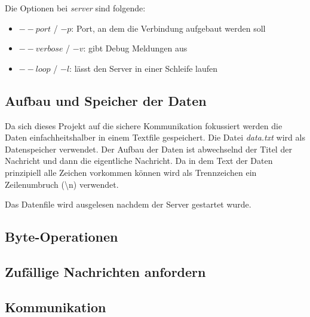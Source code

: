 \documentclass[]{article}
\begin{document}
\noindent
Die Optionen bei \textit{server} sind folgende:

\begin{itemize}
	\item $--port$ / $-p$: Port, an dem die Verbindung aufgebaut werden soll
	\item $--verbose$ / $-v$: gibt Debug Meldungen aus
	\item $--loop$ / $-l$: lässt den Server in einer Schleife laufen
\end{itemize}

\subsection{Aufbau und Speicher der Daten}
Da sich dieses Projekt auf die sichere Kommunikation fokussiert werden die Daten einfachheitshalber in einem Textfile gespeichert. Die Datei \textit{data.txt} wird als Datenspeicher verwendet. Der Aufbau der Daten ist abwechselnd der Titel der Nachricht und dann die eigentliche Nachricht. Da in dem Text der Daten prinzipiell alle Zeichen vorkommen können wird als Trennzeichen ein Zeilenumbruch (\textbackslash n) verwendet.

Das Datenfile wird ausgelesen nachdem der Server gestartet wurde.

\subsection{Byte-Operationen}
\subsection{Zufällige Nachrichten anfordern}
\subsection{Kommunikation}
\end{document}
